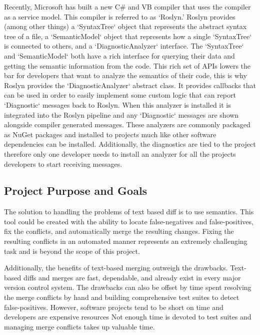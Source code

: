 \documentclass[draftclsnofoot,onecolumn]{IEEEtran}
\begin{document}
Recently, Microsoft has built a new C\# and VB compiler that uses the 
compiler as a service model. This compiler is referred to as ‘Roslyn.’ 
Roslyn provides (among other things) a `SyntaxTree` object that represents 
the abstract syntax tree of a file, a `SemanticModel` object that represents 
how a single `SyntaxTree` is connected to others, and a `DiagnosticAnalyzer` 
interface. The `SyntaxTree` and `SemanticModel` both have a rich interface 
for querying their data and getting the semantic information from the code. 
This rich set of APIs lowers the bar for developers that want to analyze the 
semantics of their code, this is why Roslyn provides the 
`DiagnosticAnalyzer` abstract class. It provides callbacks that can be used 
in order to easily implement some custom logic that can report `Diagnostic` 
messages back to Roslyn. When this analyzer is installed it is integrated 
into the Roslyn pipeline and any `Diagnostic` messages are shown alongside 
compiler generated messages. These analyzers are commonly packaged as NuGet 
packages and installed to projects much like other software dependencies can 
be installed. Additionally, the diagnostics are tied to the project 
therefore only one developer needs to install an analyzer for all the 
projects developers to start receiving messages.

\subsection{Project Purpose and Goals}

The solution to handling the problems of text based diff is to use 
semantics. This tool could be created with the ability to locate 
false-negatives and false-positives, fix the conflicts, and automatically 
merge the resulting changes. Fixing the resulting conflicts in an automated 
manner represents an extremely challenging task and is beyond the scope of 
this project.

Additionally, the benefits of text-based merging outweigh the drawbacks. 
Text-based diffs and merges are fast, dependable, and already exist in every 
major version control system. The drawbacks can also be offset by time spent 
resolving the merge conflicts by hand and building comprehensive test suites 
to detect false-positives. However, software projects tend to be short on 
time and developers are expensive resources Not enough time is devoted to 
test suites and managing merge conflicts takes up valuable time.
\end{document}

